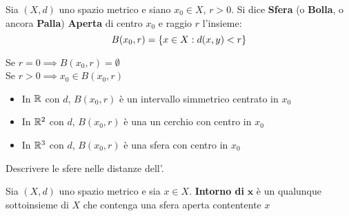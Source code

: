 \begin{definition}[Sfera]
	Sia $(X,d)$ uno spazio metrico e siano $x_0 \in X$, $r > 0$. Si dice \textbf{Sfera} (o \textbf{Bolla}, o ancora \textbf{Palla}) \textbf{Aperta} di centro $x_0$ e raggio $r$ l'insieme:
	\[B(x_0,r)=\left\{x\in X : d(x,y)<r\right\}\]
\end{definition}
\begin{observation}
	Se $r=0 \implies B(x_0,r)=\emptyset$\\
	Se $r>0 \implies x_0\in B(x_0,r)$
\end{observation}
\begin{example}\leavevmode\vspace*{-\baselineskip}
	\begin{itemize}
		\item In $\mathbb{R}$ con $d$, $B(x_0,r)$ è un intervallo simmetrico centrato in $x_0$
		\item In $\mathbb{R}^2$ con $d$, $B(x_0,r)$ è una un cerchio con centro in $x_0$
		\item In $\mathbb{R}^3$ con $d$, $B(x_0,r)$ è una sfera con centro in $x_0$
	\end{itemize}
\end{example}
\begin{exercise}
	Descrivere le sfere nelle distanze dell'.
\end{exercise}

\begin{definition}[Intorno]
	Sia $(X,d)$ uno spazio metrico e sia $x \in X$. \textbf{Intorno di} $\boldsymbol{x}$ è un qualunque sottoinsieme di $X$ che contenga una sfera aperta contentente $x$
\end{definition}

